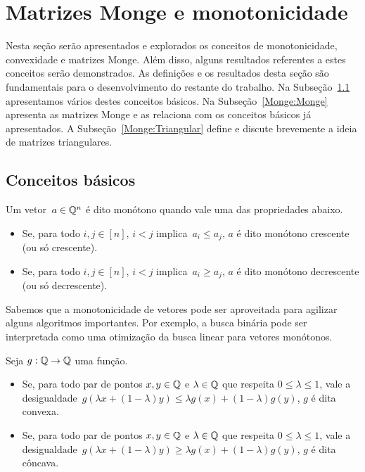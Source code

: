 \section{Matrizes Monge e monotonicidade}
\label{Monge}


Nesta seção serão apresentados e explorados os conceitos de monotonicidade, convexidade e matrizes Monge. Além disso, alguns resultados referentes a estes conceitos serão demonstrados. As definições e os resultados desta seção são fundamentais para o desenvolvimento do restante do trabalho.  Na Subseção~\ref{Monge:Basic} apresentamos vários destes conceitos básicos. Na Subseção~\ref{Monge:Monge} apresenta as matrizes Monge e as relaciona com os conceitos básicos já apresentados. A Subseção~\ref{Monge:Triangular} define e discute brevemente a ideia de matrizes triangulares.


\subsection{Conceitos básicos} \label{Monge:Basic}

\begin{defi}
Um vetor~${ a \in \mathbb{Q}^n }$ é dito monótono quando vale uma das propriedades abaixo.
\begin{itemize}
    \item Se, para todo $i,j \in [n]$, $i < j$ implica~$a_i \leq a_j$, $a$ é dito monótono crescente (ou só crescente).
    \item Se, para todo $i,j \in [n]$, $i < j$ implica~$a_i \geq a_j$, $a$ é dito monótono decrescente (ou só decrescente).
\end{itemize}
\end{defi}

Sabemos que a monotonicidade de vetores pode ser aproveitada para agilizar alguns algoritmos importantes. Por exemplo, a busca binária pode ser interpretada como uma otimização da busca linear para vetores monótonos. 

\begin{defi}
Seja $g : \mathbb{Q} \to \mathbb{Q}$ uma função.
\begin{itemize}
    \item Se, para todo par de pontos $x,y \in \mathbb{Q}$ e $\lambda \in \mathbb{Q}$ que respeita $0 \leq \lambda \leq 1$, vale a desigualdade~${g(\lambda x + (1 - \lambda)y) \leq \lambda g(x) + (1 - \lambda) g(y)}$, $g$ é dita convexa.
    \item Se, para todo par de pontos $x,y \in \mathbb{Q}$ e $\lambda \in \mathbb{Q}$ que respeita $0 \leq \lambda \leq 1$, vale a desigualdade~${g(\lambda x + (1 - \lambda)y) \geq \lambda g(x) + (1 - \lambda) g(y)}$, $g$ é dita côncava.
\end{itemize}
\end{defi}

